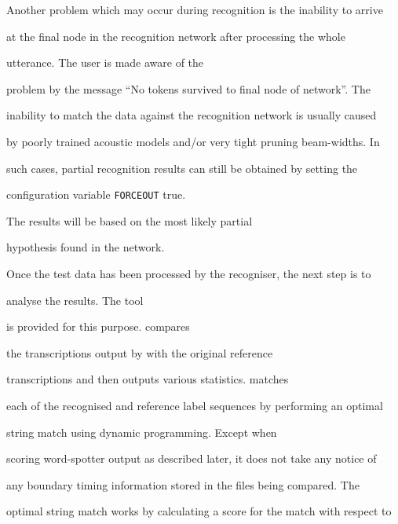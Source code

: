 Another problem which may occur during recognition is the inability to arrive


at the final node in the recognition network after processing the whole


utterance.  The user is made aware of the


problem by the message ``No tokens survived to final node of network''. The


inability to match the data against the recognition network is usually caused


by poorly trained acoustic models and/or very tight pruning beam-widths. In


such cases, partial recognition results can still be obtained by setting the


 configuration variable \texttt{FORCEOUT} true. 


 The results will be based on the most likely partial 


hypothesis found in the network.












Once the test data has been processed by the recogniser, the next step is to


analyse the results. The tool 


 is provided for this purpose.  compares 


the transcriptions output by  with the original reference


transcriptions and then outputs various statistics.  matches


each of the recognised and reference label sequences by performing an optimal


string match using dynamic programming. Except when


scoring word-spotter output as described later, it does not take any notice of


any boundary timing information stored in the files being compared.  The


optimal string match works by calculating a score for the match with respect to


